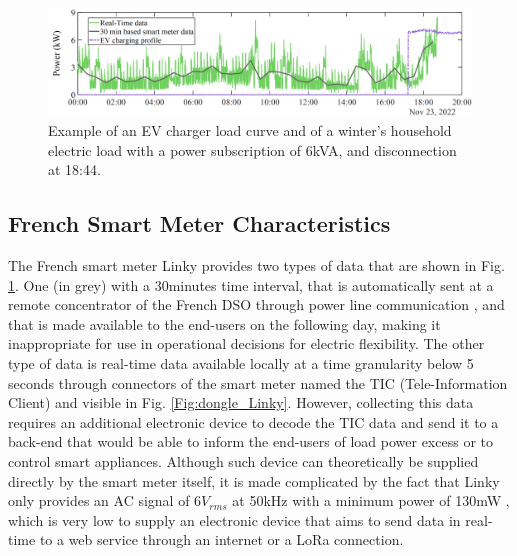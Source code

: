 \documentclass[conference]{IEEEtran}
\begin{document}
	\begin{figure}[h]
		\centering
		\includegraphics[width=1\columnwidth]{Images/load_curvesEV.png}
		\caption{Example of an EV charger load curve and of a winter's household electric load with a power subscription of 6kVA, and disconnection at 18:44.} %
	\label{Fig:load_example}
\end{figure}

\subsection{French Smart Meter Characteristics}
The French smart meter Linky provides two types of data that are shown in Fig. \ref{Fig:load_example}. One (in grey) with a 30minutes time interval, that is automatically sent at a remote concentrator of the French DSO through power line communication \cite{IEEE:LinkyInfrastructure}, and that is made available 
 to the end-users on the following day,  making it inappropriate for use in operational decisions for electric flexibility. The other type of data is real-time data available locally at a time granularity below 5 seconds
   through connectors of the smart meter named the TIC (Tele-Information Client) and visible in Fig. \ref{Fig:dongle_Linky}. However, collecting this data requires an additional electronic device  to decode the TIC data  
	and send it to a back-end that would be able to inform the end-users of load power excess or to control smart appliances. 
	Although such device can theoretically be supplied directly by the smart meter itself, it is made complicated by the fact that 
	Linky only provides an AC signal of 6$V_{rms}$ at 50kHz with a minimum power of 130mW \cite{Enedis:Linkyspec}, which is very low to supply an electronic device that aims to send data in real-time to a web service through an internet or a LoRa connection. 
\end{document}
